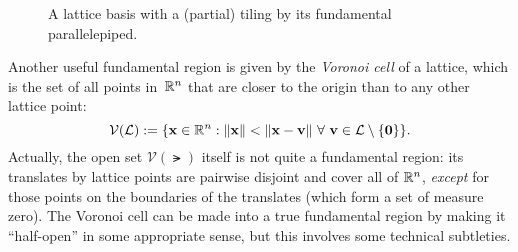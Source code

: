 \documentclass[11pt]{article}
\begin{document}
\begin{figure}[h!]
  \centering

  \caption{A lattice basis with a (partial) tiling by its fundamental
    parallelepiped.}
  \label{fig:bases-fund-pipeds}
\end{figure}

Another useful fundamental region is given by the \emph{Voronoi cell}
of a lattice, which is the set of all points in~$\mathbb{R}^{n}$ that are
closer to the origin than to any other lattice point:
\begin{equation}
  \label{eq:voronoi}
  \mathcal{V}(\mathcal{L}) := \{\mathbf{x} \in \mathbb{R}^n : \lVert\mathbf{x}\rVert <
    \lVert\mathbf{x}-\mathbf{v}\rVert\ \forall\ \mathbf{v} \in \mathcal{L} \setminus \{\mathbf{0}\} \}.
\end{equation}
Actually, the open set $\mathcal{V}(\lat)$ itself is not quite a
fundamental region: its translates by lattice points are pairwise
disjoint and cover all of $\mathbb{R}^{n}$, \emph{except} for those points on
the boundaries of the translates (which form a set of measure zero).
The Voronoi cell can be made into a true fundamental region by making
it ``half-open'' in some appropriate sense, but this involves some
technical subtleties.
\end{document}
